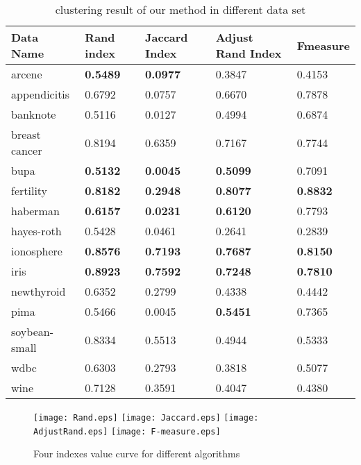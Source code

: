 	    \begin{table}[htb]
	      \centering
	      \caption{clustering result of our method in different data set}
	      \label{my-label}
	      \begin{tabular}{|lllll|}
	        \hline
	         Data Name & Rand index  & Jaccard Index  & Adjust Rand Index & F\-measure  \\ \hline
	         arcene   		& \textbf{0.5489} & \textbf{0.0977} & 0.3847 & 0.4153 \\ 
	         appendicitis   & 0.6792 & 0.0757 & 0.6670 & 0.7878 \\ 
	         banknote       & 0.5116 & 0.0127 & 0.4994 & 0.6874 \\ 
	         breast cancer  & 0.8194 & 0.6359 & 0.7167 & 0.7744 \\ 
	         bupa           & \textbf{0.5132} & \textbf{0.0045} & \textbf{0.5099} & 0.7091 \\ 
	         fertility      & \textbf{0.8182} & \textbf{0.2948} & \textbf{0.8077} & \textbf{0.8832} \\ 
	         haberman       & \textbf{0.6157} & \textbf{0.0231} & \textbf{0.6120} & 0.7793 \\ 
	         hayes-roth     & 0.5428 & 0.0461 & 0.2641 & 0.2839 \\ 
	         ionosphere     & \textbf{0.8576} & \textbf{0.7193} & \textbf{0.7687} & \textbf{0.8150} \\ 
	         iris           & \textbf{0.8923} & \textbf{0.7592} & \textbf{0.7248} & \textbf{0.7810} \\ 
	         newthyroid     & 0.6352 & 0.2799 & 0.4338 & 0.4442 \\ 
	         pima           & 0.5466 & 0.0045 & \textbf{0.5451} & 0.7365 \\ 
	         soybean-small  & 0.8334 & 0.5513 & 0.4944 & 0.5333 \\ 
	         wdbc           & 0.6303 & 0.2793 & 0.3818 & 0.5077 \\ 
	         wine           & 0.7128 & 0.3591 & 0.4047 & 0.4380 \\ 
	         \hline
	      \end{tabular}
	    \end{table}

		\begin{figure}[htb]
	    \centering
	    \texttt{[image: Rand.eps]}
	    \hspace{-6ex}
	    \texttt{[image: Jaccard.eps]}
	    \texttt{[image: AdjustRand.eps]}
	    \hspace{-6ex}
	    \texttt{[image: F-measure.eps]}
	    \caption{Four indexes value curve for different algorithms}
	    \end{figure}
